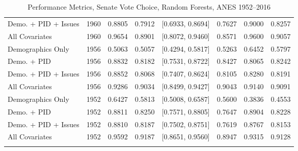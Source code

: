 \begin{longtable}{lrrrlrrr}
  Demo. + PID + Issues & 1960 & 0.8805 & 0.7912 & [0.6933, 0.8694] & 0.7627 & 0.9000 & 0.8257 \\ 
  All Covariates & 1960 & 0.9654 & 0.8901 & [0.8072, 0.9460] & 0.8571 & 0.9600 & 0.9057 \\ 
  Demographics Only & 1956 & 0.5063 & 0.5057 & [0.4294, 0.5817] & 0.5263 & 0.6452 & 0.5797 \\ 
  Demo. + PID & 1956 & 0.8832 & 0.8182 & [0.7531, 0.8722] & 0.8427 & 0.8065 & 0.8242 \\ 
  Demo. + PID + Issues & 1956 & 0.8852 & 0.8068 & [0.7407, 0.8624] & 0.8105 & 0.8280 & 0.8191 \\ 
  All Covariates & 1956 & 0.9286 & 0.9034 & [0.8499, 0.9427] & 0.9043 & 0.9140 & 0.9091 \\ 
  Demographics Only & 1952 & 0.6427 & 0.5813 & [0.5008, 0.6587] & 0.5600 & 0.3836 & 0.4553 \\ 
  Demo. + PID & 1952 & 0.8811 & 0.8250 & [0.7571, 0.8805] & 0.7647 & 0.8904 & 0.8228 \\ 
  Demo. + PID + Issues & 1952 & 0.8810 & 0.8187 & [0.7502, 0.8751] & 0.7619 & 0.8767 & 0.8153 \\ 
  All Covariates & 1952 & 0.9592 & 0.9187 & [0.8651, 0.9560] & 0.8947 & 0.9315 & 0.9128 \\ 
   \bottomrule
\caption{Performance Metrics, Senate Vote Choice, Random Forests, ANES 1952--2016} 
\label{tab:ANES_senate_rf}
\end{longtable}
